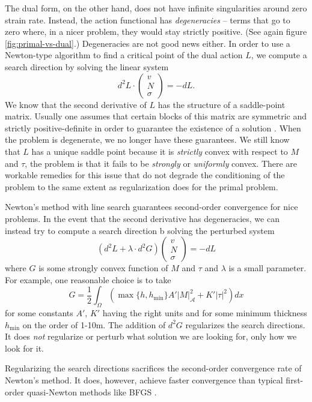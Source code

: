 \documentclass[review,oneside]{igs}
\begin{document}
The dual form, on the other hand, does not have infinite singularities around zero strain rate.
Instead, the action functional has \emph{degeneracies} -- terms that go to zero where, in a nicer problem, they would stay strictly positive.
(See again figure \ref{fig:primal-vs-dual}.)
Degeneracies are not good news either.
In order to use a Newton-type algorithm to find a critical point of the dual action $L$, we compute a search direction by solving the linear system
\begin{equation}
    d^2L\cdot\left(\begin{matrix} v \\ N \\ \sigma\end{matrix}\right) = -dL.
\end{equation}
We know that the second derivative of $L$ has the structure of a saddle-point matrix.
Usually one assumes that certain blocks of this matrix are symmetric and strictly positive-definite in order to guarantee the existence of a solution \citep{boffi2013mixed}.
When the problem is degenerate, we no longer have these guarantees.
We still know that $L$ has a unique saddle point because it is \emph{strictly} convex with respect to $M$ and $\tau$, the problem is that it fails to be \emph{strongly} or \emph{uniformly} convex.
There are workable remedies for this issue that do not degrade the conditioning of the problem to the same extent as regularization does for the primal problem.

Newton's method with line search guarantees second-order convergence for nice problems.
In the event that the second derivative has degeneracies, we can instead try to compute a search direction b solving the perturbed system
\begin{equation}
    \left(d^2L + \lambda\cdot d^2G\right)\left(\begin{matrix} v \\ N \\ \sigma\end{matrix}\right) = -dL
    \label{eq:regularized-newton-step}
\end{equation}
where $G$ is some strongly convex function of $M$ and $\tau$ and $\lambda$ is a small parameter.
For example, one reasonable choice is to take
\begin{equation}
    G = \frac{1}{2}\int_\Omega\left(\max\{h, h_{\text{min}}\}A'|M|_{\mathscr{A}}^2 + K'|\tau|^2\right)dx
\end{equation}
for some constants $A'$, $K'$ having the right units and for some minimum thickness $h_{\text{min}}$ on the order of 1-10m.
The addition of $d^2G$ regularizes the search directions.
It does \emph{not} regularize or perturb what solution we are looking for, only how we look for it.

Regularizing the search directions sacrifices the second-order convergence rate of Newton's method.
It does, however, achieve faster convergence than typical first-order quasi-Newton methods like BFGS \citep{nocedal2006numerical}.
\end{document}
